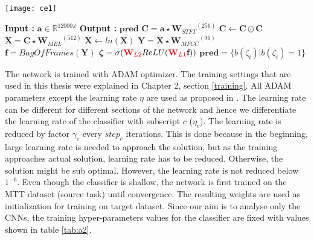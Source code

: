 \begin{algorithm}
\begin{minipage}{0.15\textwidth}
\texttt{[image: ce1]}
\end{minipage}
  \begin{minipage}{0.80\textwidth}
  \caption{$\textbf{pred}$ = $Model$($\textbf{a}$) }\label{exp:a2}
  \begin{algorithmic}[1]
    \Statex \textbf{Input :} $\textbf{a} \in \mathbb{R}^{12000.t}$
    \Statex \textbf{Output :} $\textbf{pred}$ 
    \State $\textbf{C} = \textbf{a} \star {\textbf{W}_{STFT}}^{(256)}$ 
    \State $\textbf{C} \leftarrow \textbf{C} \odot \textbf{C}$
    \State $\textbf{X} = \textbf{C} \star {\textbf{W}_{MEL}}^{(512)}$ 
    \State $\textbf{X} \leftarrow ln(\textbf{X})$
    \State $\textbf{Y} = \textbf{X} \star {\textbf{W}_{MFCC}}^{(96)}$ 
    \State $\textbf{f} = BagOfFrames(\textbf{Y})$ 
    \State $\bm{\zeta} = \sigma ({\color{red} \textbf{W}_{L2}} ReLU ({\color{red}\textbf{W}_{L1}}\textbf{f})) $ 
    \State $\textbf{pred} = \{ b(\zeta_{i}) | b(\zeta_{i}) = 1 \}$ 
  \end{algorithmic}
  \end{minipage}
\end{algorithm}
\FloatBarrier

\noindent The network is trained with ADAM optimizer. The training settings that are used in this thesis were explained in Chapter 2, section \ref{training}. All ADAM parameters except the learning rate $\eta$ are used as proposed in  \cite{adam_o}. The learning rate can be different for different sections of the network and hence we differentiate the learning rate of the classifier with subscript $c$ ($\eta_{c}$). The learning rate is reduced by factor $\gamma_{c}$ every $step_{c}$ iterations. This is done because in the beginning, large learning rate is needed to approach the solution, but as the training approaches actual solution, learning rate has to be reduced. Otherwise, the solution might be sub optimal. However, the learning rate is not reduced below $1^{-6}$. Even though the classifier is shallow, the network is first trained on the MTT dataset (source task) until convergence. The resulting weights are used as initialization for training on target dataset. Since our aim is to analyse only the CNNs, the training hyper-parameters values for the classifier are fixed with values shown in table \ref{tab:a2}.  

